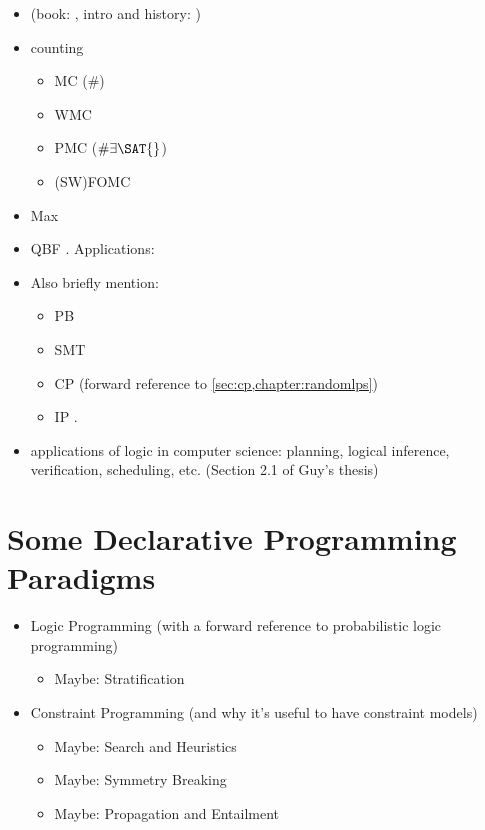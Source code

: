 \begin{itemize}
\item \SAT{} (book: \citep{DBLP:series/faia/2009-185}, intro and history: \citep{DBLP:series/faia/FrancoM09})
\item counting
  \begin{itemize}
  \item MC (\#\SAT{}) \citep{DBLP:series/faia/GomesSS09}
  \item WMC \citep{DBLP:journals/ai/ChaviraD08}
  \item PMC ($\#\exists\SAT{}$) \citep{DBLP:conf/sat/AzizCMS15}
  \item (SW)FOMC \citep{DBLP:conf/ijcai/BroeckTMDR11}
  \end{itemize}
\item Max\SAT{} \citep{bacchus2021maximum,DBLP:series/faia/LiM09}
\item QBF \citep{DBLP:series/faia/BuningB09}. Applications: \citep{DBLP:conf/ictai/ShuklaBPS19}
\item Also briefly mention:
  \begin{itemize}
  \item PB \citep{DBLP:series/faia/RousselM09}
  \item SMT \citep{DBLP:series/faia/BarrettSST09}
  \item CP \citep{DBLP:reference/fai/2} (forward reference to \cref{sec:cp,chapter:randomlps})
  \item IP \citep{wolsey2020integer}.
  \end{itemize}
\item applications of logic in computer science: planning, logical inference, verification, scheduling, etc. (Section 2.1 of Guy's thesis)
\end{itemize}

\section{Some Declarative Programming Paradigms}

\begin{itemize}
\item Logic Programming (with a forward reference to probabilistic logic programming)
  \begin{itemize}
  \item Maybe: Stratification
  \end{itemize}
\item Constraint Programming (and why it's useful to have constraint models)
  \begin{itemize}
  \item Maybe: Search and Heuristics
  \item Maybe: Symmetry Breaking
  \item Maybe: Propagation and Entailment
  \end{itemize}
\end{itemize}

